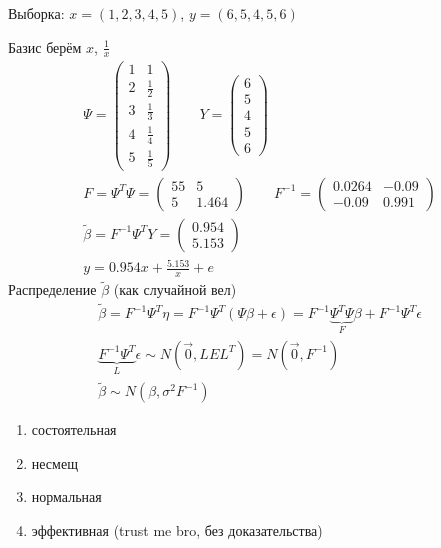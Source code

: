 \documentclass{article}
\begin{document}
\begin{eg}
  Выборка: $x=(1,2,3,4,5)$, $y=(6,5, 4, 5, 6)$

  Базис берём $x$, $\frac{1}{x}$
  \begin{gather*}
    \Psi =\begin{pmatrix}
      1 & 1 \\ 
      2 & \frac{1}{2} \\ 
      3 & \frac{1}{3} \\ 
      4 & \frac{1}{4} \\ 
      5 & \frac{1}{5}
    \end{pmatrix} \qquad 
    Y = \begin{pmatrix}
      6 \\ 5 \\ 4 \\ 5 \\ 6
    \end{pmatrix} \\ 
    F=\Psi^{T}\Psi = \begin{pmatrix}
      55 & 5 \\ 
      5 & 1.464
    \end{pmatrix} \qquad 
    F^{-1} = \begin{pmatrix}
      0.0264 & -0.09 \\ 
      -0.09 & 0.991
    \end{pmatrix} \\ 
    \tilde{\beta}=F^{-1}\Psi^{T}Y=\begin{pmatrix}
      0.954 \\ 5.153
    \end{pmatrix} \\ 
    y=0.954x + \frac{5.153}{x}+e
  \end{gather*}
  Распределение $\tilde{\beta}$ (как случайной вел)
  \begin{gather*}
    \tilde{\beta}=F^{-1}\Psi^{T}\eta = F^{-1}\Psi^{T}(\Psi\beta+\epsilon) 
    = F^{-1}\underbrace{\Psi^{T}\Psi}_{F}\beta + F^{-1}\Psi^{T}\epsilon \\ 
    \underbrace{F^{-1}\Psi^{T}}_{L}\epsilon \sim N(\vec{0},LEL^{T})=N(\vec{0}, F^{-1}) \\ 
    \tilde{\beta}\sim N(\beta, \sigma^{2}F^{-1})
  \end{gather*}
\end{eg}
\begin{remark}
  \phantom{.}

  \begin{enumerate}
    \item состоятельная
    \item несмещ
    \item нормальная
    \item эффективная (trust me bro, без доказательства)
  \end{enumerate}
\end{remark}
\end{document}
